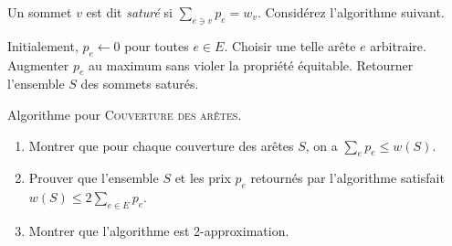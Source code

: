 \documentclass[12pt]{article}
\begin{document}

		Un sommet $v$ est dit \emph{saturé} si $\sum_{e\ni v} p_{e} = w_{v}$.
		Considérez l'algorithme suivant.
		
\begin{algorithm}[ht]
\begin{algorithmic}[1]  
\STATE Initialement, $p_{e} \gets 0$ pour toutes $e \in E$. 
	\STATE Choisir une telle arête $e$ arbitraire.
	\STATE Augmenter $p_{e}$ au maximum sans violer la propriété équitable.
\ENDWHILE
\STATE Retourner l'ensemble $S$ des sommets saturés.
\end{algorithmic}
\caption{Algorithme pour \textsc{Couverture des arêtes}.}
\label{algo:covering}
\end{algorithm}

\begin{enumerate}
	\item Montrer que pour chaque couverture des arêtes $S$, on a $\sum_{e} p_{e} \leq w(S)$.
	\item Prouver que l'ensemble $S$ et les prix $p_{e}$ retournés par l'algorithme satisfait $w(S) \leq 2 \sum_{e \in E} p_{e}$.
	\item Montrer que l'algorithme est 2-approximation.
\end{enumerate}
\end{document}
